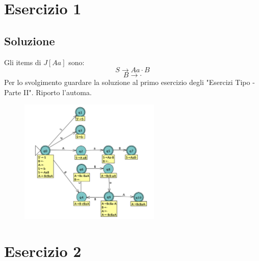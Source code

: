 \documentclass[11pt]{article}
\begin{document}
\section{Esercizio 1}
\subsection*{Soluzione}
Gli items di $J[Aa]$ sono: 
$$S \rightarrow Aa\cdot B$$
$$B \rightarrow \cdot$$
Per lo svolgimento guardare la soluzione al primo esercizio degli "Esercizi Tipo - Parte II".
Riporto l'automa.

\hypertarget{automa_1}{}
\begin{figure}[H]
\centering
  \includegraphics[width=0.6\textwidth]{../2/img/01AutomaSRL.png}
  \label{fig:01-automa}
\end{figure}

\section{Esercizio 2}
\end{document}
